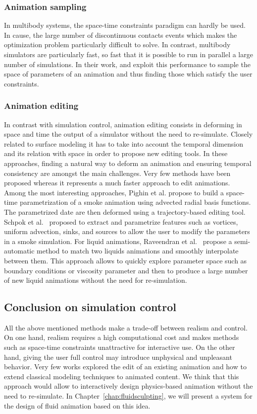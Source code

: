 \subsubsection{Animation sampling}
In multibody systems, the space-time constraints paradigm can hardly be used. In cause, the large number of discontinuous contacts events which makes the optimization problem particularly difficult to solve. In contrast, multibody simulators are particularly fast, so fast that it is possible to run in parallel a large number of simulations. In their work, \cite{Chenney2000} and \cite{Twigg2007} exploit this performance to sample the space of parameters of an animation and thus finding those which satisfy the user constraints.

\subsubsection{Animation editing} 
In contrast with simulation control, animation editing consists in deforming in space and time the output of a simulator without the need to re-simulate.
Closely related to surface modeling it has to take into account the temporal dimension and its relation with space in order to propose new editing tools. 
In these approaches, finding a natural way to deform an animation and ensuring temporal consistency are amongst the main challenges.
Very few methods have been proposed whereas it represents a much faster approach to edit animations.
Among the most interesting approaches, Pighin et al.\cite{Pighin2004} propose to build a space-time parametrization of a smoke animation using advected radial basis functions. The parametrized date are then deformed using a trajectory-based editing tool.
Schpok et al.~\cite{Schpok2005} proposed to extract and parametrize features such as vortices, uniform advection, sinks, and sources to allow the user to modify the parameters in a smoke simulation.
For liquid animations, Raveendran et al.~\cite{Raveendran2014} propose a semi-automatic method to match two liquids animations and smoothly interpolate between them. 
This approach allows to quickly explore parameter space such as boundary conditions or viscosity parameter and then to produce a large number of new liquid animations without the need for re-simulation.

\subsection{Conclusion on simulation control}

All the above mentioned methods make a trade-off between realism and control.
On one hand, realism requires a high computational cost and makes methods such as space-time constraints unattractive for interactive use.
On the other hand, giving the user full control may introduce unphysical and unpleasant behavior.
Very few works explored the edit of an existing animation and how to extend classical modeling techniques to animated content.
We think that this approach would allow to interactively design physics-based animation without the need to re-simulate.
In Chapter~\ref{chap:fluidsculpting}, we will present a system for the design of fluid animation based on this idea.
